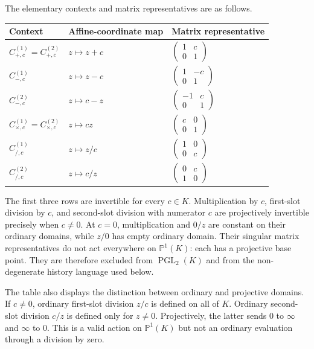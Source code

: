 The elementary contexts and matrix representatives are as follows.
\begin{center}
\renewcommand{\arraystretch}{1.35}
\begin{tabular}{lll}
\toprule
Context & Affine-coordinate map & Matrix representative \\
\midrule
$C_{+,c}^{(1)}=C_{+,c}^{(2)}$
& $z\mapsto z+c$
& $\begin{pmatrix}1&c\\0&1\end{pmatrix}$ \\
$C_{-,c}^{(1)}$
& $z\mapsto z-c$
& $\begin{pmatrix}1&-c\\0&1\end{pmatrix}$ \\
$C_{-,c}^{(2)}$
& $z\mapsto c-z$
& $\begin{pmatrix}-1&c\\0&1\end{pmatrix}$ \\
$C_{\times,c}^{(1)}=C_{\times,c}^{(2)}$
& $z\mapsto cz$
& $\begin{pmatrix}c&0\\0&1\end{pmatrix}$ \\
$C_{/,c}^{(1)}$
& $z\mapsto z/c$
& $\begin{pmatrix}1&0\\0&c\end{pmatrix}$ \\
$C_{/,c}^{(2)}$
& $z\mapsto c/z$
& $\begin{pmatrix}0&c\\1&0\end{pmatrix}$ \\
\bottomrule
\end{tabular}
\end{center}
The first three rows are invertible for every $c\in K$.  Multiplication by
$c$, first-slot division by $c$, and second-slot division with numerator $c$
are projectively invertible precisely when $c\ne0$.  At $c=0$, multiplication
and $0/z$ are constant on their ordinary domains, while $z/0$ has empty
ordinary domain.  Their singular matrix representatives do not act everywhere
on $\mathbb P^1(K)$: each has a projective base point.  They are therefore
excluded from $\operatorname{PGL}_2(K)$ and from the non-degenerate history
language used below.

The table also displays the distinction between ordinary and projective
domains.  If $c\ne0$, ordinary first-slot division $z/c$ is defined on all of
$K$.  Ordinary second-slot division $c/z$ is defined only for $z\ne0$.
Projectively, the latter sends $0$ to $\infty$ and $\infty$ to $0$.  This is a
valid action on $\mathbb P^1(K)$ but not an ordinary evaluation through a
division by zero.

